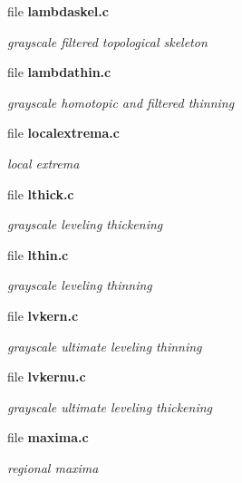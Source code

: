 \begin{CompactItemize}
\item 
file {\bf lambdaskel.c}
\begin{CompactList}\small\item\em grayscale filtered topological skeleton \item\end{CompactList}

\item 
file {\bf lambdathin.c}
\begin{CompactList}\small\item\em grayscale homotopic and filtered thinning \item\end{CompactList}

\item 
file {\bf localextrema.c}
\begin{CompactList}\small\item\em local extrema \item\end{CompactList}

\item 
file {\bf lthick.c}
\begin{CompactList}\small\item\em grayscale leveling thickening \item\end{CompactList}

\item 
file {\bf lthin.c}
\begin{CompactList}\small\item\em grayscale leveling thinning \item\end{CompactList}

\item 
file {\bf lvkern.c}
\begin{CompactList}\small\item\em grayscale ultimate leveling thinning \item\end{CompactList}

\item 
file {\bf lvkernu.c}
\begin{CompactList}\small\item\em grayscale ultimate leveling thickening \item\end{CompactList}

\item 
file {\bf maxima.c}
\begin{CompactList}\small\item\em regional maxima \item\end{CompactList}


\end{CompactItemize}
